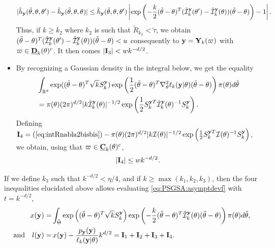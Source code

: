\begin{proofb}
\begin{itemize}
            \begin{align}   
                 |\hat h_{\mathbf{y}}(\tilde\theta,\theta,\theta') - \hat h_{\mathbf{y}}(\tilde\theta,\theta,\theta) | 
                    \leq \hat h_{\mathbf{y}}(\tilde\theta,\theta,\theta')\left|\exp\left( -\frac{k}{2}(\tilde\theta-\theta)^T(\hat{\mathcal{I}}_k^{\mathbf{y}}(\theta')-\hat{\mathcal{I}}_k^{\mathbf{y}}(\theta))(\tilde\theta-\theta) \right)-1\right|.
            \end{align}
        Thus, if $k\geq k_2$ where $k_2$ is such that $\tilde R_{k_2}<\tilde\tau$, we obtain $(\tilde\theta-\theta)^T(\hat{\mathcal{I}}_k^{\mathbf{y}}(\theta')-\hat{\mathcal{I}}_k^{\mathbf{y}}(\theta))(\tilde\theta-\theta) < u$ consequently to $\mathbf{y}=\mathbf{Y}_k(\varpi)$ with $\varpi\in\underline{\mathbf{D}}_k(\theta)^c$. 
        It then comes $|\mathbf{I}_3|< w k^{-d/2}$.

        \item  By recognizing a Gaussian density in the integral below, we get the equality 
        \begin{align}
        \nonumber
            &\int_{\mathbb{R}^d}\exp((\tilde\theta-\theta)^T\sqrt{k}S_k^{\mathbf{y}})\exp\left(\frac{1}{2}(\tilde\theta-\theta)^T\nabla_\theta^2\ell_k(\mathbf{y}|\theta)(\tilde\theta-\theta)\right)\pi(\theta)d\tilde\theta \\
            &=
            \pi(\theta)(2\pi)^{d/2}|k\hat{\mathcal{I}}_k^{\mathbf{y}}(\theta)|^{-1/2}\exp\left(\frac{1}{2}S_k^{\mathbf{y} T}\hat{\mathcal{I}}_k^{\mathbf{y}}(\theta)^{-1}S_k^{\mathbf{y}}\right).
            \label{eq:intRnabla2bisbis}
        \end{align}
        Defining $\mathbf{I}_4= (\ref{eq:intRnabla2bisbis}) - \pi(\theta)(2\pi)^{d/2}|k\mathcal{I}(\theta)|^{-1/2}\exp\left(\frac{1}{2}S_k^{\mathbf{y}T}\mathcal{I}(\theta)^{-1}S_k^{\mathbf{y}}\right)$, we obtain,
        using that $\varpi\in \underline{\mathbf{C}}_k(\theta)^c$, 
        \begin{equation}
            |\mbf I_4|  %
            \leq w k^{-d/2}.
        \end{equation}
    \end{itemize}

If we define $k_3$ such that $k^{-d/2}<\eta/4$, and if $k\geq\max(k_1,k_2,k_3)$, then the four inequalities elucidated above allows evaluating \cref{eq:PSGSA:asymptdevf} with $t=k^{-d/2}$,
\begin{equation}
    \begin{aligned}
    x(\mathbf{y}) = & \int_{\tilde\Theta} \exp\left((\tilde\theta-\theta)^T\sqrt{k}S_k^{\mathbf{y}}\right)\exp\left( -\frac{k}{2}(\tilde\theta-\theta)^T\hat{\mathcal{I}}_k^{\mathbf{y}}(\theta)(\tilde\theta-\theta) \right)\pi(\theta )d\tilde\theta,\\
        \text{and}\quad l(\mathbf{y}) =&\, x(\mathbf{y})-\frac{p_{\mathbf{y}}(\mathbf{y})}{\ell_k(\mathbf{y}|\theta)}k^{d/2} = \mathbf{I}_1+\mathbf{I}_2+\mathbf{I}_3+\mathbf{I}_4.
    \end{aligned}
\end{equation}


\end{proofb}
